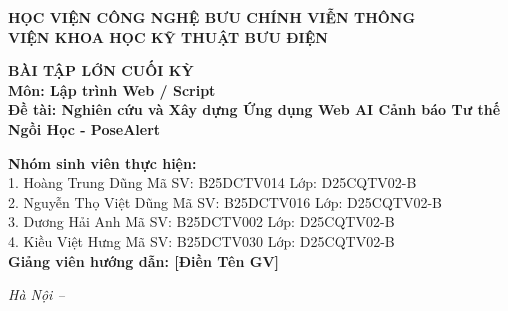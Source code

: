 \documentclass[12pt,a4paper]{report}
\begin{document}
\begin{titlepage}
    \begin{center}
        \textbf{\large HỌC VIỆN CÔNG NGHỆ BƯU CHÍNH VIỄN THÔNG}\\
        \textbf{\large VIỆN KHOA HỌC KỸ THUẬT BƯU ĐIỆN}\\
        \vspace{1.5cm}
        
        \vspace{1.5cm}
        \textbf{\large BÀI TẬP LỚN CUỐI KỲ}\\
        \textbf{\large Môn: Lập trình Web / Script}\\
        \vspace{1cm}
        \textbf{\huge Đề tài: Nghiên cứu và Xây dựng Ứng dụng Web AI Cảnh báo Tư thế Ngồi Học - PoseAlert}\\
        
        \vspace{3cm}
        \begin{flushleft}
            \hspace{2cm}\textbf{Nhóm sinh viên thực hiện:} \\
            \hspace{2.5cm} 1. Hoàng Trung Dũng \hspace{1cm} Mã SV: B25DCTV014 \hspace{0.5cm} Lớp: D25CQTV02-B\\
            \hspace{2.5cm} 2. Nguyễn Thọ Việt Dũng \hspace{0.5cm} Mã SV: B25DCTV016 \hspace{0.5cm} Lớp: D25CQTV02-B\\
            \hspace{2.5cm} 3. Dương Hải Anh \hspace{1.3cm} Mã SV: B25DCTV002 \hspace{0.5cm} Lớp: D25CQTV02-B\\
            \hspace{2.5cm} 4. Kiều Việt Hưng \hspace{1.3cm} Mã SV: B25DCTV030 \hspace{0.5cm} Lớp: D25CQTV02-B\\
            \vspace{0.5cm}
            \hspace{2cm}\textbf{Giảng viên hướng dẫn: [Điền Tên GV]}\\
        \end{flushleft}
        
        \vfill
        \textit{Hà Nội – \the\year}
    \end{center}
\end{titlepage}
\end{document}
